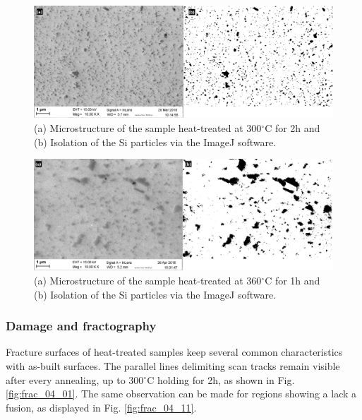 \begin{figure}[ht]
	\centering
	\centerline{\includegraphics[scale=0.30]{Images/SEM-TT300-2-real_20.png}}
	\decoRule
	\caption[(a) Microstructure of the sample heat-treated at 300$^\circ$C for 2h and (b) Isolation of the Si particles via the ImageJ software]{(a) Microstructure of the sample heat-treated at 300$^\circ$C for 2h and (b) Isolation of the Si particles via the ImageJ software.}
	\label{fig:ms_300_2}
\end{figure}

\begin{figure}[ht]
	\centering
	\centerline{\includegraphics[scale=0.30]{Images/SEM-TT360-1-real-08.png}}
	\decoRule
	\caption[(a) Microstructure of the sample heat-treated at 360$^\circ$C for 1h and (b) Isolation of the Si particles via the ImageJ software]{(a) Microstructure of the sample heat-treated at 360$^\circ$C for 1h and (b) Isolation of the Si particles via the ImageJ software.}
	\label{fig:ms_360_1}
\end{figure}

\subsubsection{Damage and fractography}

Fracture surfaces of heat-treated samples keep several common characteristics with as-built surfaces. The parallel lines delimiting scan tracks remain visible after every annealing, up to 300$^\circ$C holding for 2h, as shown in Fig. \ref{fig:frac_04_01}. The same observation can be made for regions showing a lack a fusion, as displayed in Fig. \ref{fig:frac_04_11}.\\

